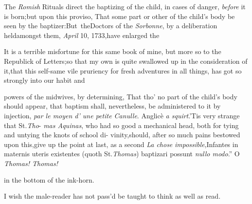 \documentclass[twoside]{article}
\begin{document}
\vfill
\bgroup\fontsize{8}{11}\selectfont
\indent\fnast\enspace The \textit{Romish} Rituals direct
the baptizing of the child, in cases of danger, \textit{before} it is born;\tsk but
upon this proviso, That some part or other of the child’s body be seen by the
baptizer:\tsh But~the\break Doctors of the \textit{Sorbonne}, by a deliberation
held\break amongst them, \textit{April} 10, 1733,\tsk have enlarged
the\break{}\par\egroup\eject

It is a terrible misfortune for this same book of mine, but more
so to the Republick of Letters;\tsk so that my own\break
is quite swallowed up in the consideration of it,\tsk that this
self-same vile pruriency for fresh adventures in all things, has
got so strongly into our habit and 
\break
{}


\bgroup\fontsize{8}{11}\selectfont
\noindent powers of the midwives, by determining, That\break
tho’ no part of the child’s body should appear,\tsh\break
that baptism shall, nevertheless, be administered to it by injection,\tsk
\textit{par le moyen d’ une petite Canulle}.\tsk\break
Anglicè \textit{a squirt}.\tsk ’Tis very strange that St.\@ \textit{Tho}-\break
\textit{mas Aquinas}, who had so good a mechanical head,\break
both for tying and untying the knots of school di-\break
vinity,\tsk should, after so much pains bestowed upon\break
this,\tsk give up the point at last, as a second \textit{La chose}\break
\textit{impossible},\tsk \lqq Infantes in maternis uteris existentes\break
(quoth St.\@ \textit{Thomas}) baptizari possunt \textit{nullo modo}.”\tsk\break
O \textit{Thomas! Thomas!}\\\par\egroup\eject

\noindent
{} 
in the bottom of the ink-horn.

I wish the male-reader has not pass’d
be taught to think as well as read.
\end{document}
